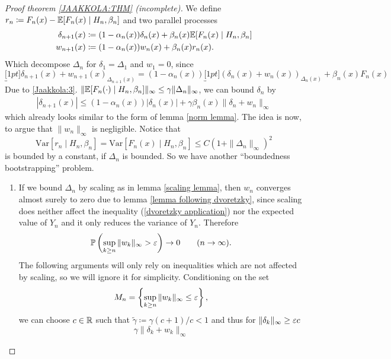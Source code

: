 \begin{proof}[Proof theorem \ref{JAAKKOLA:THM} (incomplete)]
    We define \(r_n\coloneqq F_n(x)-\mathbb{E}[F_n(x)\mid H_n,\beta_n]\) and two parallel processes
    \begin{align*}
        \delta_{n+1}(x)
        &\coloneqq(1-\alpha_n(x))\delta_n(x)+\beta_n(x)\mathbb{E}[F_n(x)\mid H_n,\beta_n]\\
        w_{n+1}(x)
        &\coloneqq(1-\alpha_n(x))w_n(x)+\beta_n(x)r_n(x).
    \end{align*}
    Which decompose \(\Delta_n\) for \(\delta_1=\Delta_1\) and \(w_1=0\), since
    \[
        \underbracket[1pt]{\delta_{n+1}(x)+w_{n+1}(x)}_{\Delta_{n+1}(x)}
        = (1-\alpha_n(x))\underbracket[1pt]{(\delta_n(x)+w_n(x))}_{\Delta_n(x)}
        +\beta_n(x) F_n(x)
    \]
    Due to \ref{Jaakkola:3}. \(\|\mathbb{E}[F_n(\cdot)\mid H_n,\beta_n]\|_\infty\le \gamma \|\Delta_n\|_\infty\), we can bound \(\delta_n\) by
    \begin{align*}
        |\delta_{n+1}(x)| 
        \le (1-\alpha_n(x))|\delta_n(x)|+\gamma \beta_n(x)\|\delta_n+w_n\|_\infty
    \end{align*}
    which already looks similar to the form of lemma \ref{norm lemma}. The idea is now, to argue that \(\|w_n\|_\infty\) is negligible. Notice that
    \[
        \text{Var}[r_n\mid H_n,\beta_n]=\text{Var}[F_n(x)\mid H_n,\beta_n]
        \le C(1+\|\Delta_n\|_\infty)^2
    \]
    is bounded by a constant, if \(\Delta_n\) is bounded. So we have another ``boundedness bootstrapping'' problem. 
\begin{enumerate}[label= Step \arabic*:, ref= Step \arabic*, leftmargin=0pt]
    \item\label{thm:step1} If we bound \(\Delta_n\) by scaling as in lemma \ref{scaling lemma}, then \(w_n\) converges almost surely to zero due to lemma \ref{lemma following dvoretzky}, since scaling does neither affect the inequality (\ref{dvoretzky application}) nor the expected value of \(Y_n\) and it only reduces the variance of \(Y_n\). Therefore
    \[
        \mathbb{P}\left(\sup_{k\ge n} \|w_k\|_\infty > \varepsilon\right) \to 0 \qquad (n\to \infty).
    \]
    The following arguments will only rely on inequalities which are not affected by scaling, so we will ignore it for simplicity. Conditioning on the set 
    \[
        M_n=\left\{\sup_{k\ge n} \|w_k\|_\infty \le \varepsilon \right\},
    \]
    we can choose \(c\in\mathbb{R}\) such that \(\tilde{\gamma}\coloneqq \gamma (c+1)/c <1\) and thus for \(\|\delta_k\|_\infty \ge \varepsilon c\)
    \[
        \gamma \|\delta_k +w_k\|_\infty 
\]
\end{enumerate}
\end{proof}
